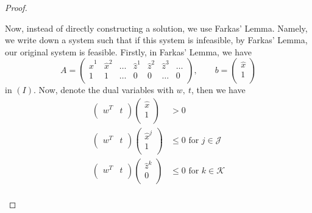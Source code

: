 \begin{proof}
\begin{enumerate}
		      Now, instead of directly constructing a solution, we use Farkas' Lemma. Namely, we write down a system such that
		      if this system is infeasible, by Farkas' Lemma, our original system is feasible. Firstly, in Farkas' Lemma, we have
		      \[
			      A = \begin{pmatrix}
				      \hat{x}^1 & \hat{x}^2 & \ldots & \hat{z}^1 & \hat{z}^2 & \hat{z}^3 & \ldots \\
				      1         & 1         & \ldots & 0         & 0         & \ldots    & 0      \\
			      \end{pmatrix},\qquad b = \begin{pmatrix}
				      \hat{x} \\
				      1       \\
			      \end{pmatrix}
		      \]
		      in \((I)\). Now, denote the dual variables with \(w,\ t\), then we have
		      \[
			      \begin{split}
				      \begin{pmatrix}
					      w^{T} & t \\
				      \end{pmatrix}\begin{pmatrix}
					      \hat{x} \\
					      1       \\
				      \end{pmatrix}&>0\\
				      \begin{pmatrix}
					      w^{T} & t \\
				      \end{pmatrix}\begin{pmatrix}
					      \hat{x}^j \\
					      1         \\
				      \end{pmatrix}&\leq 0 \text{ for }j\in\mathcal{J}\\
				      \begin{pmatrix}
					      w^{T} & t \\
				      \end{pmatrix}\begin{pmatrix}
					      \hat{z}^k \\
					      0         \\
				      \end{pmatrix}&\leq 0 \text{ for }k\in\mathcal{K}\\
			      \end{split}
\]
\end{enumerate}
\end{proof}
